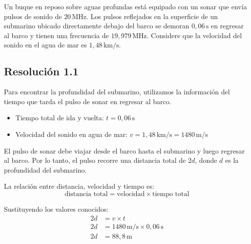 \documentclass[
  11pt,
  letterpaper,
   addpoints,
   answers
  ]{exam}
\begin{document}
\begin{questions}
\question Un buque en reposo sobre aguas profundas está equipado con un sonar que envía pulsos de sonido de $20\,\mathrm{MHz}$. Los pulsos reflejados en la superficie de un submarino ubicado directamente debajo del barco se demoran $0{,}06\,\mathrm{s}$ en regresar al barco y tienen una frecuencia de $19{,}979\,\mathrm{MHz}$. Considere que la velocidad del sonido en el agua de mar es $1{,}48\,\mathrm{km/s}$.

\begin{solution}
\subsection*{Resolución 1.1 }

Para encontrar la profundidad del submarino, utilizamos la información del tiempo que tarda el pulso de sonar en regresar al barco.

\begin{itemize}
    \item Tiempo total de ida y vuelta: $t = 0{,}06\,\mathrm{s}$
    \item Velocidad del sonido en agua de mar: $v = 1{,}48\,\mathrm{km/s} = 1480\,\mathrm{m/s}$
\end{itemize}


El pulso de sonar debe viajar desde el barco hasta el submarino y luego regresar al barco. Por lo tanto, el pulso recorre una distancia total de $2d$, donde $d$ es la profundidad del submarino.

La relación entre distancia, velocidad y tiempo es:
\begin{equation}
\text{distancia total} = \text{velocidad} \times \text{tiempo total}
\end{equation}

Sustituyendo los valores conocidos:
\begin{align}
2d &= v \times t \\
2d &= 1480\,\mathrm{m/s} \times 0{,}06\,\mathrm{s} \\
2d &= 88{,}8\,\mathrm{m}
\end{align}


\end{solution}
\end{questions}
\end{document}
